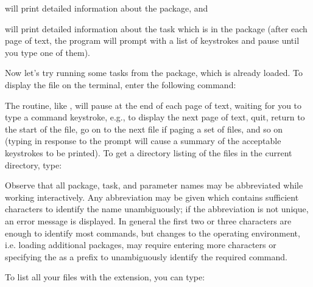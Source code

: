 \begin{quotation}\noindent
{} 
\end{quotation}

\noindent
will print detailed information about the  package, and

\begin{quotation}\noindent
{} 
\end{quotation}

\noindent
will print detailed information about the  task which is
in the  package (after each page of text, the 
program will prompt with a list of keystrokes and pause until you type one
of them).

Now let's try running some tasks from the  package, which
is already loaded.  To display the file  on the terminal,
enter the following command:

\begin{quotation}\noindent
{} 
\end{quotation}

The  routine, like , will pause at the end of
each page of text, waiting for you to type a command keystroke, e.g.,
to display the next page of text, quit, return to the start of the file,
go on to the next file if paging a set of files, and so on (typing 
in response to the  prompt will cause a summary of the
acceptable keystrokes to be printed).  To get a directory listing of the
files in the current directory, type:

\begin{quotation}\noindent
{} 
\end{quotation}

\noindent
Observe that all package, task, and parameter names may be abbreviated
while working interactively.  Any abbreviation may be given which contains
sufficient characters to identify the name unambiguously; if the 
abbreviation is not unique, an error message is displayed.  In general
the first two or three characters are enough to identify most commands,
but changes to the operating environment, i.e. loading additional packages,
may require entering more characters or specifying the 
as a prefix to unambiguously identify the required command.

To list all your files with the  extension, you can type:

